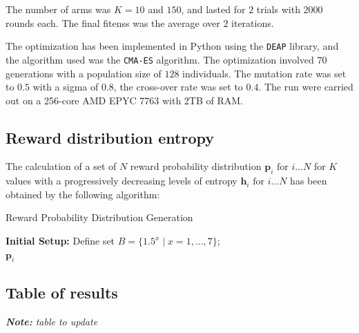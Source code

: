 \noindent The number of arms was $K=10$ and $150$, and lasted for $2$ trials with $2000$ rounds each.
The final fitenss was the average over $2$ iterations.

\hfill \break
The optimization has been implemented in Python using the \texttt{DEAP} library, and the algorithm used was the \texttt{CMA-ES} algorithm. The optimization involved $70$ generations with a population size of $128$ individuals. The mutation rate was set to $0.5$ with a sigma of $0.8$, the cross-over rate was set to $0.4$.
The run were carried out on a 256-core AMD EPYC 7763 with 2TB of RAM.


\subsection{Reward distribution entropy}\label{sec:appendix_entropy}

\noindent The calculation of a set of $N$ reward probability distribution $\mathbf{p}_{i}\text{  for  } i\ldots N$ for $K$ values with a progressively decreasing levels of entropy $\mathbf{h}_{i}\text{  for  } i\ldots N$ has been obtained by the following algorithm:

\begin{algorithm}[ht]
\caption{Reward Probability Distribution Generation}
\label{alg:reward_distribution}
\SetAlgoLined
{}
\textbf{Initial Setup:}
Define set $B = \{1.5^x \mid x = 1, \ldots, 7\}$; \\
\Return ${\mathbf{p}_i}$
\end{algorithm}


\subsection{Table of results}

\textit{\textbf{Note:} table to update}

